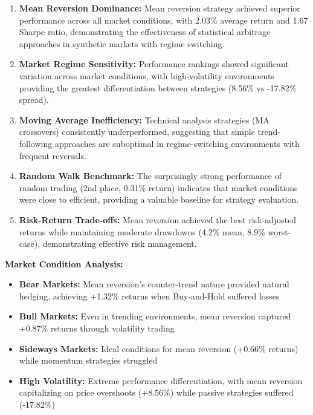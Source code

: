 \documentclass[11pt]{article}
\begin{document}
\begin{enumerate}
\item \textbf{Mean Reversion Dominance:} Mean reversion strategy achieved superior performance across all market conditions, with 2.03\% average return and 1.67 Sharpe ratio, demonstrating the effectiveness of statistical arbitrage approaches in synthetic markets with regime switching.

\item \textbf{Market Regime Sensitivity:} Performance rankings showed significant variation across market conditions, with high-volatility environments providing the greatest differentiation between strategies (8.56\% vs -17.82\% spread).

\item \textbf{Moving Average Inefficiency:} Technical analysis strategies (MA crossovers) consistently underperformed, suggesting that simple trend-following approaches are suboptimal in regime-switching environments with frequent reversals.

\item \textbf{Random Walk Benchmark:} The surprisingly strong performance of random trading (2nd place, 0.31\% return) indicates that market conditions were close to efficient, providing a valuable baseline for strategy evaluation.

\item \textbf{Risk-Return Trade-offs:} Mean reversion achieved the best risk-adjusted returns while maintaining moderate drawdowns (4.2\% mean, 8.9\% worst-case), demonstrating effective risk management.

\end{enumerate}
\textbf{Market Condition Analysis:}
\begin{itemize}
\item \textbf{Bear Markets:} Mean reversion's counter-trend nature provided natural hedging, achieving +1.32\% returns when Buy-and-Hold suffered losses
\item \textbf{Bull Markets:} Even in trending environments, mean reversion captured +0.87\% returns through volatility trading
\item \textbf{Sideways Markets:} Ideal conditions for mean reversion (+0.66\% returns) while momentum strategies struggled
\item \textbf{High Volatility:} Extreme performance differentiation, with mean reversion capitalizing on price overshoots (+8.56\%) while passive strategies suffered (-17.82\%)

\end{itemize}
\end{document}
